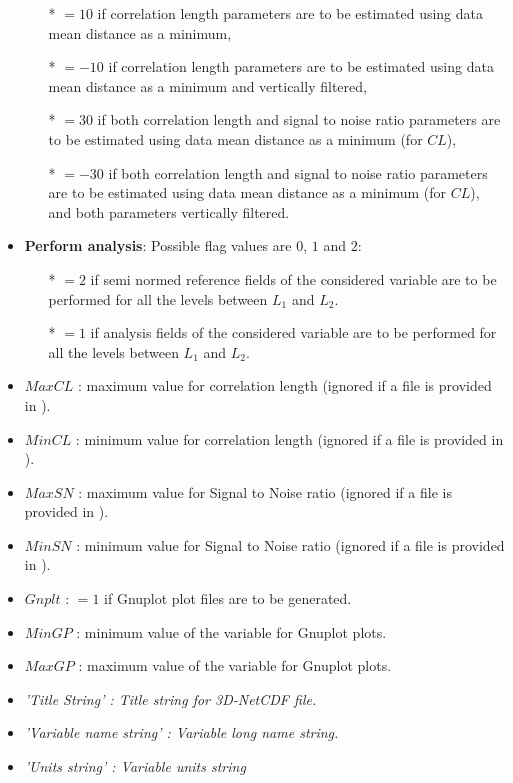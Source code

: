 \begin{itemize}
\begin{itemize}
                \item[*] $=10$ if correlation length parameters are to be estimated using data mean distance as a minimum,
                \item[*] $=-10$ if correlation length parameters are to be estimated using data mean distance as a minimum and vertically filtered,
                \item[*] $=30$ if both  correlation length and  signal to noise ratio parameters are to be estimated using data mean distance as a minimum (for $CL$),
                \item[*] $=-30$ if both  correlation length and  signal to noise ratio parameters are to be estimated using data mean distance as a minimum (for $CL$), and both parameters vertically filtered.
              \end{itemize}

\item {\bf Perform analysis}: Possible flag values are $0$, $1$ and $2$:
              \begin{itemize}
                \item[*] $=2$ if semi normed reference fields of the considered variable are to be performed for all the levels between $L_1$ and $L_2$.
                \item[*] $=1$ if analysis fields of the considered variable are to be performed for all the levels between $L_1$ and $L_2$.
              \end{itemize}
\item $MaxCL$ : maximum value for correlation length (ignored if a  file is provided in ).
\item $MinCL$ : minimum value for correlation length  (ignored if a  file is provided in ).
\item $MaxSN$ : maximum value for Signal to Noise ratio (ignored if a  file is provided in ).
\item $MinSN$ : minimum value for Signal to Noise ratio (ignored if a  file is provided in ).
\item $Gnplt$ : $=1$ if Gnuplot plot files are to be generated.
\item $MinGP$ : minimum value of the variable for Gnuplot plots.
\item $MaxGP$ : maximum value of the variable for Gnuplot plots.
\item \it{'Title String'} : Title string for 3D-NetCDF file.
\item \it{'Variable name string'} : Variable long name string.
\item \it{'Units string'} : Variable units string
\end{itemize}


